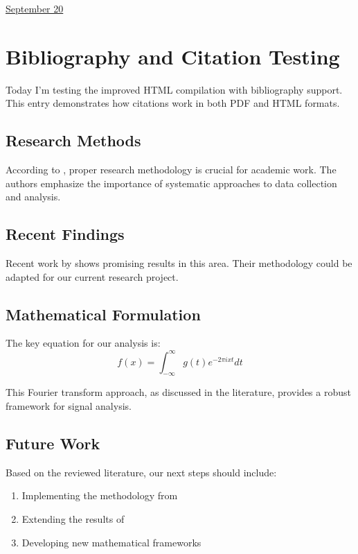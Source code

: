 \documentclass[11pt,letterpaper]{article}
\begin{document}
\href{run:2025-09-20-bibliography-test.tex}{\Huge September 20} %

\section{Bibliography and Citation Testing}

Today I'm testing the improved HTML compilation with bibliography support. This entry demonstrates how citations work in both PDF and HTML formats.

\subsection{Research Methods}

According to \cite{research_methods2024}, proper research methodology is crucial for academic work. The authors emphasize the importance of systematic approaches to data collection and analysis.

\subsection{Recent Findings}

Recent work by \cite{example2025} shows promising results in this area. Their methodology could be adapted for our current research project.

\subsection{Mathematical Formulation}

The key equation for our analysis is:
\begin{equation}
f(x) = \int_{-\infty}^{\infty} g(t) e^{-2\pi i x t} dt
\end{equation}

This Fourier transform approach, as discussed in the literature, provides a robust framework for signal analysis.

\subsection{Future Work}

Based on the reviewed literature, our next steps should include:
\begin{enumerate}
\item Implementing the methodology from \cite{research_methods2024}
\item Extending the results of \cite{example2025}
\item Developing new mathematical frameworks
\end{enumerate}

 
\end{document}
